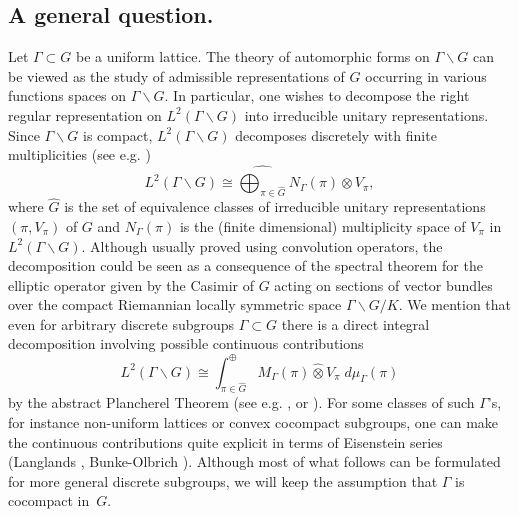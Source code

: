 \documentclass[10]{amsart}
\theoremstyle{remark}
\theoremstyle{definition}
\numberwithin{equation}{section}
\newcommand{\Hom}{\mathrm{Hom}}
\begin{document}
\subsection{A general question.}\label{gq} 
 Let $\Gamma\subset G$ be a uniform lattice. The theory of automorphic forms on 
$\Gamma\backslash G$ can be viewed as the study of admissible representations of $G$ occurring in various functions spaces on $\Gamma\backslash G$. In particular, one wishes to decompose the right regular representation on $L^2(\Gamma\backslash G)$ into irreducible unitary representations. Since $\Gamma\backslash G$ is compact, $L^2(\Gamma\backslash G)$ decomposes discretely with finite multiplicities (see e.g. \cite{GGPS})
%
\begin{equation}\label{GGPS}
L^2(\Gamma\backslash G)\cong \widehat{\bigoplus_{\pi\in\widehat{G}}}N_\Gamma(\pi)\otimes V_\pi,
\end{equation}
%
where $\widehat{G}$ is the set of equivalence classes of irreducible unitary representations $(\pi,V_\pi)$ of $G$ and $N_\Gamma(\pi)$
is the (finite dimensional) multiplicity space of $V_\pi$ in $L^2(\Gamma\backslash G)$. Although usually proved using convolution operators, the decomposition could be seen as a consequence of the spectral theorem for the elliptic operator given by the Casimir of $G$ acting on sections of vector bundles over the  compact Riemannian locally symmetric space $\Gamma\backslash G/K$. We mention that even for arbitrary discrete subgroups 
$\Gamma\subset G$ there is a direct integral decomposition involving possible continuous contributions
%
\begin{equation}\label{GGPSter}
L^2(\Gamma\backslash G)\cong \int^{\oplus}_{\pi\in\widehat{G}}M_\Gamma(\pi)\widehat{\otimes} V_\pi\; d\mu_\Gamma(\pi)
\end{equation}
%
by the abstract Plancherel Theorem (see e.g. \cite{Di}, or  \cite[Ch. 14]{Wa92}). For some classes of such $\Gamma$'s, for instance non-uniform lattices or convex cocompact subgroups, one can make the continuous contributions quite explicit in terms of Eisenstein series (Langlands \cite{La76}, Bunke-Olbrich \cite{BO00}). Although most of what follows can be formulated for more general discrete subgroups, we will keep the assumption that $\Gamma$ is cocompact in~$G$. 
\end{document}
